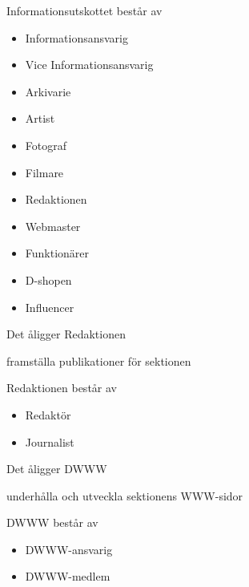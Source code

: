 \documentclass[pdfbookmarks,a4paper,11pt]{article}
\newlength{\itemcollength}
\newenvironment{reglemlista}{%
  \begin{list}{}{%
      \setlength{\labelwidth}{\itemcollength}%
      \setlength{\leftmargin}{\labelwidth + \labelsep}%
      \renewcommand{\makelabel}[1]{%
        \raisebox{0pt}[1ex][0pt]{%
          \makebox[\labelwidth][l]{%
            \parbox[t]{\itemcollength}{%
              \raggedright\hspace{0pt}##1}}}\hfill}%
      }}{%
  \end{list}}
\begin{document}
\begin{reglemlista}
\begin{reglemlista}
	\item[Sammansättning]
	Informationsutskottet består av
	\begin{itemize}
		\item Informationsansvarig
		\item Vice Informationsansvarig
		\item Arkivarie
		\item Artist
		\item Fotograf
		\item Filmare
    \item Redaktionen
		\item Webmaster
		\item Funktionärer
    \item D-shopen
    \item Influencer
	\end{itemize}


    \item[\textbf{Redaktionen}]

    \item[Åliggande]
    Det åligger Redaktionen
    \begin{attlista}
	\item framställa publikationer för sektionen
    \end{attlista}

    \item[Sammansättning]
    Redaktionen består av 
    \begin{itemize}
        \item Redaktör
        \item Journalist
    \end{itemize}

	\item[\textbf{DWWW}]

	\item[Åligganden]
	Det åligger DWWW
	\begin{attlista}
		\item underhålla och utveckla sektionens WWW-sidor
	\end{attlista}

	\item[Sammansättning]
	DWWW består av
	\begin{itemize}
		\item DWWW-ansvarig
		\item DWWW-medlem
	\end{itemize}

\end{reglemlista}



\end{reglemlista}
\end{document}
